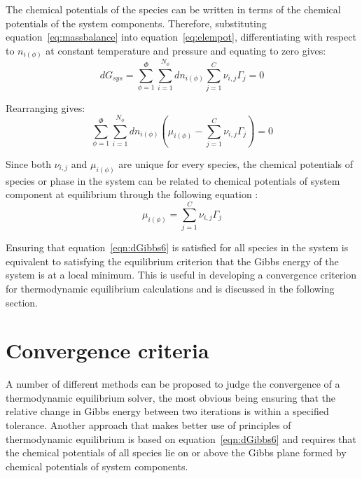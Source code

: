 		The chemical potentials of the species can be written in terms of the chemical potentials of the system components. Therefore, substituting equation~\ref{eq:massbalance} into equation~\ref{eq:elempot}, differentiating with respect to $n_{i(\phi)}$ at constant temperature and pressure and equating to zero gives:
		\begin{equation}\label{eqn:dGibbs4}
			d G_{sys} = \sum_{\phi=1}^{\Phi} \sum_{i=1}^{N_{\phi}}  d n_{i(\phi)}\sum_{j=1}^{C}\nu_{i,j}\Gamma_j  = 0
		\end{equation}

		Rearranging gives:
		\begin{equation}\label{eqn:dGibbs5}
			\sum_{\phi=1}^{\Phi} \sum_{i=1}^{N_{\phi}}  d n_{i(\phi)} \left( \mu_{i(\phi)} - \sum_{j=1}^{C}\nu_{i,j}\Gamma_j \right) = 0
		\end{equation}

		Since both $\nu_{i,j}$ and $\mu_{i(\phi)}$ are unique for every species, the chemical potentials of species or phase in the system can be related to chemical potentials of system component at equilibrium through the following equation \cite{vanZeggeren11}:
		\begin{equation}\label{eqn:dGibbs6}
			\mu_{i(\phi)} = \sum_{j=1}^{C}\nu_{i,j}\Gamma_j
		\end{equation}

		Ensuring that equation~\ref{eqn:dGibbs6} is satisfied for all species in the system is equivalent to satisfying the equilibrium criterion that the Gibbs energy of the system is at a local minimum. This is useful in developing a convergence criterion for thermodynamic equilibrium calculations and is discussed in the following section.

	\section{Convergence criteria}
	A number of different methods can be proposed to judge the convergence of a thermodynamic equilibrium solver, the most obvious being ensuring that the relative change in Gibbs energy between two iterations is within a specified tolerance. Another approach that makes better use of principles of thermodynamic equilibrium is based on equation~\ref{eqn:dGibbs6} and requires that the chemical potentials of all species lie on or above the Gibbs plane formed by chemical potentials of system components.
